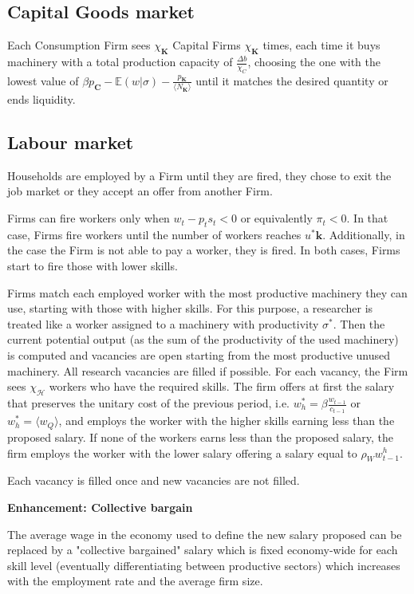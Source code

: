 \documentclass[a4paper, headings=standardclasses]{scrartcl}
\newenvironment{enh}[1][]{\begin{framed}\noindent\textbf{Enhancement: #1}\par}{\end{framed}}
\begin{document}
\subsection{Capital Goods market}
Each Consumption Firm sees $\chi_\mathbf{K}$ Capital Firms $\chi_\mathbf{K}$ times, each time it buys machinery with a total production capacity of $\frac{\Delta b}{\chi_C}$, choosing the one with the lowest value of $\beta p_\mathbf{C} - \mathbb{E}(w|\sigma) - \frac{p_\mathbf{K}}{\langle N_\mathbf{K} \rangle}$ until it matches the desired quantity or ends liquidity. %

\subsection{Labour market}
Households are employed by a Firm until they are fired, they chose to exit the job market or they accept an offer from another Firm.

Firms can fire workers only when $w_t - p_t s_t < 0$ or equivalently $\pi_t < 0$. In that case, Firms fire workers until the number of workers reaches $u^* \mathbf{k}$. Additionally, in the case the Firm is not able to pay a worker, they is fired. In both cases, Firms start to fire those with lower skills.

Firms match each employed worker with the most productive machinery they can use, starting with those with higher skills. For this purpose, a researcher is treated like a worker assigned to a machinery with productivity $\sigma^*$.
Then the current potential output (as the sum of the productivity of the used machinery) is computed and vacancies are open starting from the most productive unused machinery. All research vacancies are filled if possible.
For each vacancy, the Firm sees $\chi_\mathcal{H}$ workers who have the required skills. The firm offers at first the salary that preserves the unitary cost of the previous period, i.e. $w^*_h = \beta \frac{w_{t-1}}{c_{t-1}}$ or $w^*_h = \langle w_Q \rangle$, and employs the worker with the higher skills earning less than the proposed salary. If none of the workers earns less than the proposed salary, the firm employs the worker with the lower salary offering a salary equal to $\rho_W w^h_{t-1}$.

Each vacancy is filled once and new vacancies are not filled.

\begin{enh}[Collective bargain]
    The average wage in the economy used to define the new salary proposed can be replaced by a "collective bargained" salary which is fixed economy-wide for each skill level (eventually differentiating between productive sectors) which increases with the employment rate and the average firm size.
\end{enh}
\end{document}
